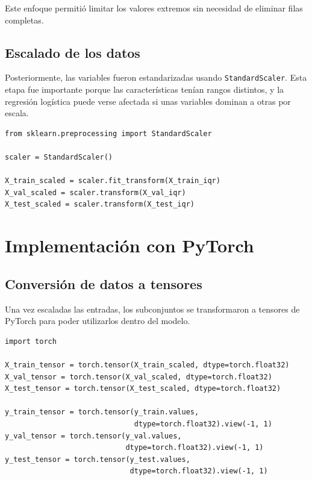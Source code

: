 \documentclass[conference]{IEEEtran}
\begin{document}
Este enfoque permitió limitar los valores extremos sin necesidad de eliminar filas completas.

\subsection{Escalado de los datos}

Posteriormente, las variables fueron estandarizadas usando \texttt{StandardScaler}. Esta etapa fue importante porque las características tenían rangos distintos, y la regresión logística puede verse afectada si unas variables dominan a otras por escala.

\begin{lstlisting}[caption={Escalado de las variables con StandardScaler}, label={lst:scaler}]
from sklearn.preprocessing import StandardScaler

scaler = StandardScaler()

X_train_scaled = scaler.fit_transform(X_train_iqr)
X_val_scaled = scaler.transform(X_val_iqr)
X_test_scaled = scaler.transform(X_test_iqr)
\end{lstlisting}

\section{Implementación con PyTorch}

\subsection{Conversión de datos a tensores}

Una vez escaladas las entradas, los subconjuntos se transformaron a tensores de PyTorch para poder utilizarlos dentro del modelo.

\begin{lstlisting}[caption={Conversión de datos a tensores}, label={lst:tensors}]
import torch

X_train_tensor = torch.tensor(X_train_scaled, dtype=torch.float32)
X_val_tensor = torch.tensor(X_val_scaled, dtype=torch.float32)
X_test_tensor = torch.tensor(X_test_scaled, dtype=torch.float32)

y_train_tensor = torch.tensor(y_train.values,
                              dtype=torch.float32).view(-1, 1)
y_val_tensor = torch.tensor(y_val.values,
                            dtype=torch.float32).view(-1, 1)
y_test_tensor = torch.tensor(y_test.values,
                             dtype=torch.float32).view(-1, 1)
\end{lstlisting}
\end{document}
